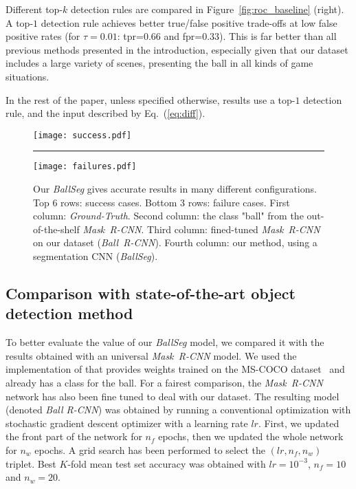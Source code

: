 \documentclass[sigconf, screen]{acmart}
\begin{document}
Different top-$k$ detection rules are compared in Figure~\ref{fig:roc_baseline} (right). A top-$1$ detection rule achieves better true/false positive trade-offs at low false positive rates (for $\tau=0.01$: {\sc tpr}=$0.66$ and {\sc fpr}=$0.33$). This is far better than all previous methods presented in the introduction, especially given that our dataset includes a large variety of scenes, presenting the ball in all kinds of game situations.

In the rest of the paper, unless specified otherwise, results use a top-$1$ detection rule, and the input described by Eq.~(\ref{eq:diff}).


\begin{figure*}
    \begin{center}
    \texttt{[image: success.pdf]}
    \hrule
    \texttt{[image: failures.pdf]}
    \end{center}
    \vspace{-10pt}
    \caption{Our \emph{BallSeg} gives accurate results in many different configurations. Top 6 rows: success cases. Bottom 3 rows: failure cases. First column: \emph{Ground-Truth}. Second column: the class "ball" from the out-of-the-shelf \emph{Mask~R-CNN}. Third column: fined-tuned \emph{Mask~R-CNN} on our dataset (\emph{Ball~R-CNN}). Fourth column: our method, using a segmentation CNN (\emph{BallSeg}).}
    \label{fig:results}
\end{figure*}

\subsection{Comparison with state-of-the-art object detection method}
\label{subsec:compare}

To better evaluate the value of our \emph{BallSeg} model, we compared it with the results obtained with an universal \emph{Mask~R-CNN} model. We used the implementation of \cite{matterport_maskrcnn_2017} that provides weights trained on the MS-COCO dataset~\cite{coco} and already has a class for the ball.
For a fairest comparison, the \emph{Mask~R-CNN} network has also been fine tuned to deal with our dataset. The resulting model (denoted \emph{Ball R-CNN}) was obtained by running a conventional optimization with stochastic gradient descent optimizer with a learning rate $lr$. First, we updated the front part of the network for $n_f$ epochs, then we updated the whole network for $n_w$ epochs. A grid search has been performed to select the $(lr, n_f,n_w)$ triplet. Best $K$-fold mean test set accuracy was obtained with $lr=10^{-3}$, $n_f=10$ and $n_w=20$.
\end{document}
